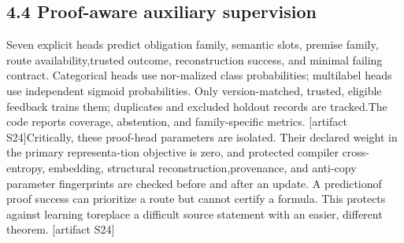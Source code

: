 \subsection*{4.4  Proof-aware auxiliary supervision}
\noindent
Seven explicit heads predict obligation family, semantic slots, premise family, route availability,\linebreak[4]
trusted outcome, reconstruction success, and minimal failing contract. Categorical heads use nor-\linebreak[4]
malized class probabilities; multilabel heads use independent sigmoid probabilities. Only version-\linebreak[4]
matched, trusted, eligible feedback trains them; duplicates and excluded holdout records are tracked.\linebreak[4]
The code reports coverage, abstention, and family-specific metrics. [artifact S24]\linebreak[4]
Critically, these proof-head parameters are isolated. Their declared weight in the primary representa-\linebreak[4]
tion objective is zero, and protected compiler cross-entropy, embedding, structural reconstruction,\linebreak[4]
provenance, and anti-copy parameter fingerprints are checked before and after an update. A prediction\linebreak[4]
of proof success can prioritize a route but cannot certify a formula. This protects against learning to\linebreak[4]
replace a difficult source statement with an easier, different theorem. [artifact S24]\par

